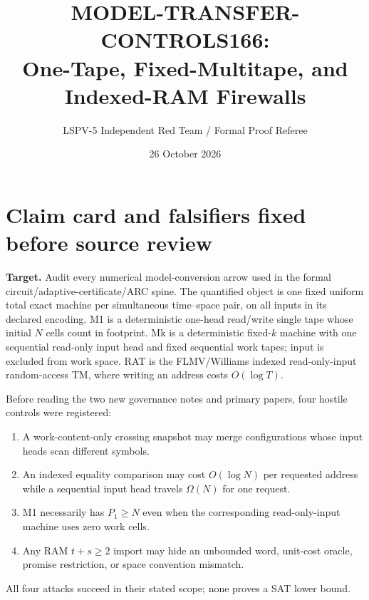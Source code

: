 \documentclass[11pt]{article}
\title{MODEL-TRANSFER-CONTROLS166:\\
One-Tape, Fixed-Multitape, and Indexed-RAM Firewalls}
\author{LSPV-5 Independent Red Team / Formal Proof Referee}
\date{26 October 2026}
\begin{document}
\maketitle

\begin{center}
\end{center}

\section{Claim card and falsifiers fixed before source review}
\textbf{Target.} Audit every numerical model-conversion arrow used in the
formal circuit/adaptive-certificate/ARC spine.  The quantified object is one
fixed uniform total exact machine per simultaneous time--space pair, on all
inputs in its declared encoding.  M1 is a deterministic one-head read/write
single tape whose initial $N$ cells count in footprint.  Mk is a deterministic
fixed-$k$ machine with one sequential read-only input head and fixed sequential
work tapes; input is excluded from work space.  RAT is the FLMV/Williams
indexed read-only-input random-access TM, where writing an address costs
$O(\log T)$.

Before reading the two new governance notes and primary papers, four hostile
controls were registered:
\begin{enumerate}
\item A work-content-only crossing snapshot may merge configurations whose
input heads scan different symbols.
\item An indexed equality comparison may cost $O(\log N)$ per requested
address while a sequential input head travels $\Omega(N)$ for one request.
\item M1 necessarily has $P_1\ge N$ even when the corresponding read-only-input
machine uses zero work cells.
\item Any RAM $t+s\ge2$ import may hide an unbounded word, unit-cost oracle,
promise restriction, or space convention mismatch.
\end{enumerate}
All four attacks succeed in their stated scope; none proves a SAT lower bound.
\end{document}
